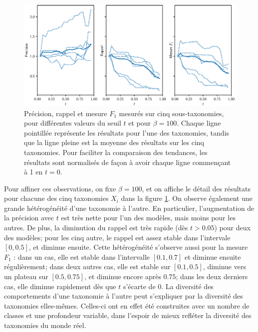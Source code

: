 \begin{figure}[h]
    \centering
    \includegraphics[width=\textwidth]{fig/plot/threshold_breakdown_avg_no_event.eps}
    \caption[Influence du seuil de probabilité sur l'extraction de taxonomie pour $\beta=100$]{Précision, rappel et mesure $F_1$ mesurés sur cinq sous-taxonomies, pour différentes valeurs du seuil $t$ et pour $\beta=100$. Chaque ligne pointillée représente les résultats pour l'une des taxonomies, tandis que la ligne pleine est la moyenne des résultats sur les cinq taxonomies. Pour faciliter la comparaison des tendances, les résultats sont normalisés de façon à avoir chaque ligne commençant à 1 en $t = 0$.}
    \label{fig:threshold-search-1}
\end{figure}

Pour affiner ces observations, on fixe $\beta = 100$, et on affiche le détail des résultats pour chacune des cinq taxonomies $X_i$ dans la figure \ref{fig:threshold-search-1}. On observe également une grande hétérogénéité d'une taxonomie à l'autre. En particulier, l'augmentation de la précision avec $t$ est très nette pour l'un des modèles, mais moins pour les autres. De plus, la diminution du rappel est très rapide (dès $t > 0.05$) pour deux des modèles; pour les cinq autre, le rappel est assez stable dans l'intervale $[0, 0.5]$, et diminue ensuite. Cette hétérogénéité s'observe aussi pour la mesure $F_1$ : dans un cas, elle est stable dans l'intervalle $[0.1, 0.7]$ et diminue ensuite régulièrement; dans deux autres cas, elle est stable sur $[0.1, 0.5]$, diminue vers un plateau sur $[0.5, 0.75]$, et diminue encore après $0.75$; dans les deux derniers cas, elle diminue rapidement dès que $t$ s'écarte de $0$. La diversité des comportements d'une taxonomie à l'autre peut s'expliquer par la diversité des taxonomies elles-mêmes. Celles-ci ont en effet été construites avec un nombre de classes et une profondeur variable, dans l'espoir de mieux refléter la diversité des taxonomies du monde réel.

